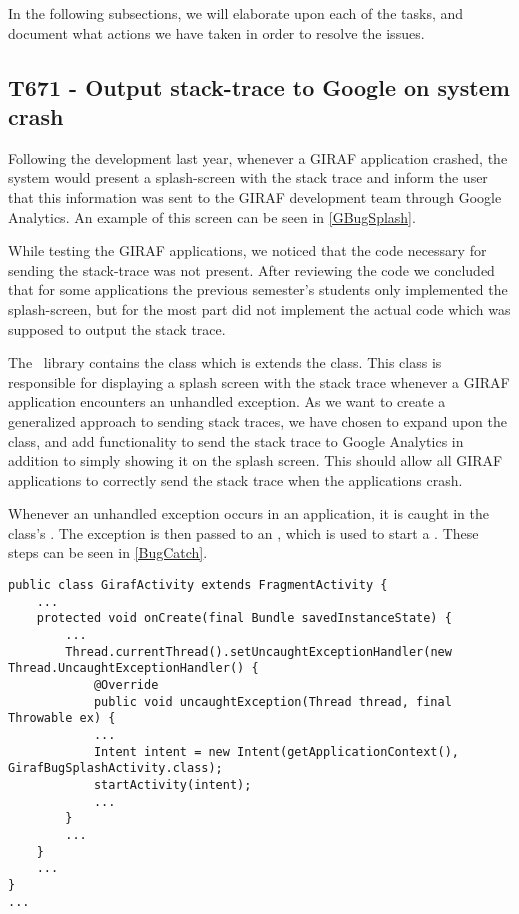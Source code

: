 In the following subsections, we will elaborate upon each of the tasks, and
document what actions we have taken in order to resolve the issues.

\newpage
\subsection{T671 - Output stack-trace to Google on system crash}\label{T672}
Following the development last year, whenever a GIRAF application crashed, the
system would present a splash-screen with the stack trace and inform the user
that this information was sent to the GIRAF development team through Google
Analytics. An example of this screen can be seen in \autoref{GBugSplash}.


While testing the GIRAF applications, we noticed that the code necessary for
sending the stack-trace was not present. After reviewing the code we concluded
that for some applications the previous semester's students only implemented the
splash-screen, but for the most part did not implement the actual code which was
supposed to output the stack trace.\nl

The \clib\ library contains the
 class which is extends the 
class. This class is responsible for displaying a splash screen with the
stack trace whenever a GIRAF application encounters an unhandled exception. As
we want to create a generalized approach to sending stack traces, we have chosen
to expand upon the  class, and add functionality
to send the stack trace to Google Analytics in addition to simply showing it on
the splash screen. This should allow all GIRAF applications to correctly send
the stack trace when the applications crash. \nl

Whenever an unhandled exception occurs in an application, it is caught in the
 class's . The exception is
then passed to an , which is used to start a
. These steps can be seen in
\autoref{BugCatch}.\nl


\begin{minipage}[H]{\linewidth}
\begin{lstlisting}[caption = Catching exceptions and starting creating a \textc{GirafBugSplashActivity}, label = BugCatch]
public class GirafActivity extends FragmentActivity {
	...
    protected void onCreate(final Bundle savedInstanceState) {
    	...
    	Thread.currentThread().setUncaughtExceptionHandler(new Thread.UncaughtExceptionHandler() {
            @Override
            public void uncaughtException(Thread thread, final Throwable ex) {
            ...
            Intent intent = new Intent(getApplicationContext(), GirafBugSplashActivity.class);
			startActivity(intent);
			...
		}
		...
	}
	...
}
...			
\end{lstlisting}
\end{minipage}


